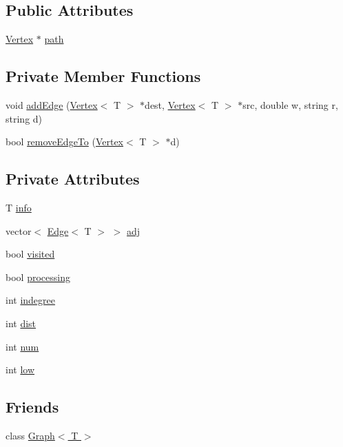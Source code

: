 \subsection*{Public Attributes}
\begin{DoxyCompactItemize}
\item 
\hyperlink{class_vertex}{Vertex} $\ast$ \hyperlink{class_vertex_abd40febd917aa25add6bd42237c8463a}{path}
\end{DoxyCompactItemize}
\subsection*{Private Member Functions}
\begin{DoxyCompactItemize}
\item 
void \hyperlink{class_vertex_ad0345b64511f76cbe93a767ec88642b2}{add\+Edge} (\hyperlink{class_vertex}{Vertex}$<$ T $>$ $\ast$dest, \hyperlink{class_vertex}{Vertex}$<$ T $>$ $\ast$src, double w, string r, string d)
\item 
bool \hyperlink{class_vertex_ab2b5b43fb1709a901b78718436763a84}{remove\+Edge\+To} (\hyperlink{class_vertex}{Vertex}$<$ T $>$ $\ast$d)
\end{DoxyCompactItemize}
\subsection*{Private Attributes}
\begin{DoxyCompactItemize}
\item 
T \hyperlink{class_vertex_a415d7811eef6cdd992f0dca1f35a49cd}{info}
\item 
vector$<$ \hyperlink{class_edge}{Edge}$<$ T $>$ $>$ \hyperlink{class_vertex_a5d9dfdd2caee11e300ff5142799345a1}{adj}
\item 
bool \hyperlink{class_vertex_a187a2fe4ff50261cf3c15b8cda7dfc56}{visited}
\item 
bool \hyperlink{class_vertex_ae575d4b9a6b1ada3f9626c458c060f54}{processing}
\item 
int \hyperlink{class_vertex_ab29ac1b694fc673ba26cfc6d3e9bda13}{indegree}
\item 
int \hyperlink{class_vertex_ab2e06daa1acc81f7bd75f3d45c73a49a}{dist}
\item 
int \hyperlink{class_vertex_aeb941bcd51ef71c6101e02eaed1cae12}{num}
\item 
int \hyperlink{class_vertex_a35d937c418952520cfa26b098e86b755}{low}
\end{DoxyCompactItemize}
\subsection*{Friends}
\begin{DoxyCompactItemize}
\item 
class \hyperlink{class_vertex_aefa9b76cd57411c5354e5620dc2d84dd}{Graph$<$ T $>$}
\end{DoxyCompactItemize}


